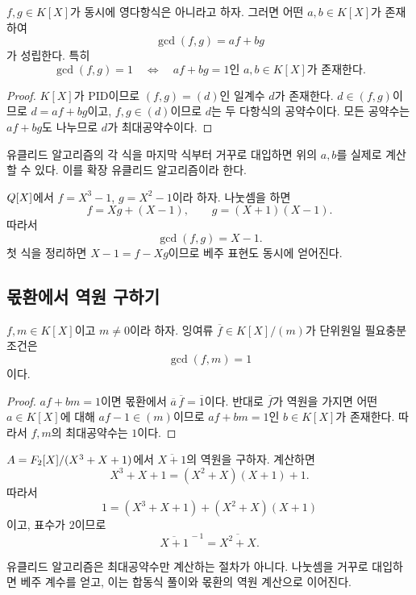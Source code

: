 \begin{theorem}[베주 항등식]
$f,g\in K[X]$가 동시에 영다항식은 아니라고 하자. 그러면 어떤 $a,b\in K[X]$가 존재하여
\[
  \gcd(f,g)=af+bg
\]
가 성립한다. 특히
\[
  \gcd(f,g)=1
  \quad\Longleftrightarrow\quad
  af+bg=1\text{인 }a,b\in K[X]\text{가 존재한다.}
\]
\end{theorem}

\begin{proof}
$K[X]$가 PID이므로 $(f,g)=(d)$인 일계수 $d$가 존재한다. $d\in(f,g)$이므로 $d=af+bg$이고, $f,g\in(d)$이므로 $d$는 두 다항식의 공약수이다. 모든 공약수는 $af+bg$도 나누므로 $d$가 최대공약수이다.
\end{proof}

유클리드 알고리즘의 각 식을 마지막 식부터 거꾸로 대입하면 위의 $a,b$를 실제로 계산할 수 있다. 이를 확장 유클리드 알고리즘이라 한다.

\begin{example}
$Q[X]$에서 $f=X^3-1$, $g=X^2-1$이라 하자. 나눗셈을 하면
\[
 f=Xg+(X-1),\qquad g=(X+1)(X-1).
\]
따라서
\[
  \gcd(f,g)=X-1.
\]
첫 식을 정리하면 $X-1=f-Xg$이므로 베주 표현도 동시에 얻어진다.
\end{example}

\subsection{몫환에서 역원 구하기}

\begin{proposition}
$f,m\in K[X]$이고 $m\ne0$이라 하자. 잉여류 $\overline f\in K[X]/(m)$가 단위원일 필요충분조건은
\[
  \gcd(f,m)=1
\]
이다.
\end{proposition}

\begin{proof}
$af+bm=1$이면 몫환에서 $\overline a\,\overline f=\overline1$이다. 반대로 $\overline f$가 역원을 가지면 어떤 $a\in K[X]$에 대해 $af-1\in(m)$이므로 $af+bm=1$인 $b\in K[X]$가 존재한다. 따라서 $f,m$의 최대공약수는 $1$이다.
\end{proof}

\begin{example}
$A=F_2[X]/(X^3+X+1)$에서 $\overline{X+1}$의 역원을 구하자. 계산하면
\[
 X^3+X+1=(X^2+X)(X+1)+1.
\]
따라서
\[
  1=(X^3+X+1)+(X^2+X)(X+1)
\]
이고, 표수가 $2$이므로
\[
  \overline{X+1}^{\,-1}=\overline{X^2+X}.
\]
\end{example}

\begin{keyidea}
유클리드 알고리즘은 최대공약수만 계산하는 절차가 아니다. 나눗셈을 거꾸로 대입하면 베주 계수를 얻고, 이는 합동식 풀이와 몫환의 역원 계산으로 이어진다.
\end{keyidea}
